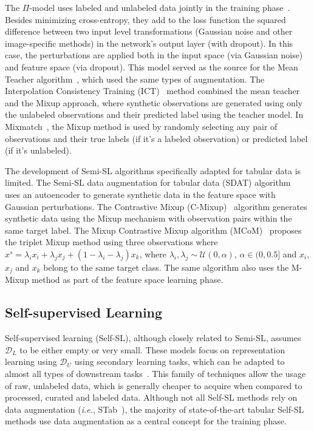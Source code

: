 \documentclass[parskip=full]{scrartcl}
\begin{document}
The $\Pi$-model uses labeled and unlabeled data jointly in the training
phase~\cite{samuli2017temporal}. Besides minimizing cross-entropy, they add to
the loss function the squared difference between two input level
transformations (Gaussian noise and other image-specific methods) in the
network's output layer (with dropout). In this case, the perturbations are
applied both in the input space (via Gaussian noise) and feature space (via
dropout). This model served as the source for the Mean Teacher
algorithm~\cite{tarvainen2017mean}, which used the same types of augmentation.
The Interpolation Consistency Training (ICT)~\cite{verma2022interpolation}
method combined the mean teacher and the Mixup approach, where synthetic
observations are generated using only the unlabeled observations and their
predicted label using the teacher model. In
Mixmatch~\cite{berthelot2019mixmatch}, the Mixup method is used by randomly
selecting any pair of observations and their true labels (if it's a labeled
observation) or predicted label (if it's unlabeled).

The development of Semi-SL algorithms specifically adapted for tabular data is
limited. The Semi-SL data augmentation for tabular data (SDAT)
algorithm~\cite{fang2022semi} uses an autoencoder to generate synthetic data
in the feature space with Gaussian perturbations. The Contrastive Mixup
(C-Mixup)~\cite{darabi2021contrastive} algorithm generates synthetic data
using the Mixup mechanism with observation pairs within the same target label.
The Mixup Contrastive Mixup algorithm (MCoM)~\cite{li2022mcom} proposes the
triplet Mixup method using three observations where $x^s = \lambda_ix_i +
\lambda_jx_j + (1-\lambda_i-\lambda_j)x_k$, where $\lambda_i, \lambda_j \sim
\mathcal{U}(0, \alpha)$, $\alpha \in (0, 0.5]$ and $x_i$, $x_j$ and $x_k$
belong to the same target class. The same algorithm also uses the M-Mixup
method as part of the feature space learning phase.


\subsection{Self-supervised Learning}\label{sec:self-supervised-learning}

Self-supervised learning (Self-SL), although closely related to Semi-SL,
assumes $\mathcal{D}_L$ to be either empty or very small. These models focus
on representation learning using $\mathcal{D}_U$ using secondary learning
tasks, which can be adapted to almost all types of downstream
tasks~\cite{liu2021self}. This family of techniques allow the usage of raw,
unlabeled data, which is generally cheaper to acquire when compared to
processed, curated and labeled data. Although not all Self-SL methods rely on
data augmentation (\textit{i.e.}, STab~\cite{hajiramezanali2022stab}), the
majority of state-of-the-art tabular Self-SL methods use data augmentation as
a central concept for the training phase.
\end{document}
